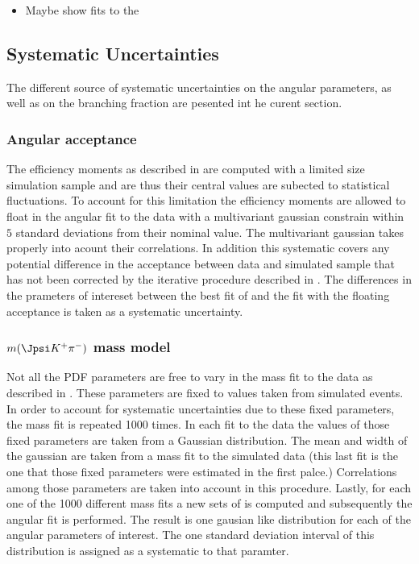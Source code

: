 \begin{itemize}
\item {\color{red} Maybe show fits to the \BdJpsiKst}
\end{itemize}

\clearpage
\clearpage

\subsection{Systematic Uncertainties}
\label{systemics}
The different source of systematic uncertainties on the \Bs angular parameters, as well as on the branching fraction
are pesented int he curent section.

\subsubsection{Angular acceptance}
\label{systAngAcc}
The efficiency moments as described in  are computed with a limited size simulation sample
and are thus their central values are subected to statistical fluctuations. To account for this limitation the
efficiency moments are allowed to float in the angular fit to the data with a multivariant gaussian constrain within $5$
standard deviations from their nominal value. The multivariant gaussian takes properly into acount their correlations.
In addition this systematic covers any potential difference in the acceptance between data and simulated sample
that has not been corrected by the iterative procedure described in . The differences
in the prameters of intereset between the best fit of  and the fit with the floating acceptance
is taken as a systematic uncertainty. 

\subsubsection{$m(\Jpsi K^+\pi^-)$ mass model}
\label{systMassModel}
Not all the PDF parameters are free to vary in the mass fit to the data as described in . 
These parameters are fixed to values taken from simulated events. 
In order to account for systematic uncertainties due to these fixed parameters, the mass fit is repeated 1000 times. In each fit
to the data the values of those fixed parameters are taken from a Gaussian distribution. The mean and width of the gaussian are
taken from a mass fit to the simulated data (this last fit is the one that those fixed parameters were estimated in the first palce.)
Correlations among those parameters are taken into account in this procedure. Lastly, for each one of the 1000 different mass fits
a new sets of \sWeights is computed and subsequently the angular fit is performed. The result is one gausian like distribution
for each of the angular parameters of interest. The one standard deviation interval of this distribution is assigned as a systematic to that paramter.

